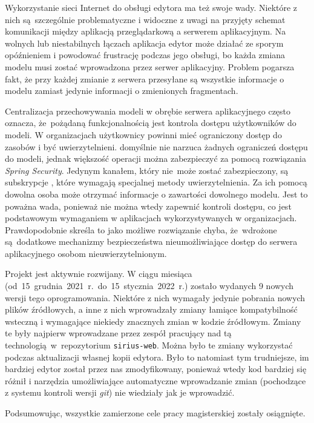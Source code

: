Wykorzystanie sieci Internet do obsługi edytora ma też swoje wady. Niektóre z
nich są~szczególnie problematyczne i widoczne z uwagi na przyjęty schemat
komunikacji między aplikacją przeglądarkową a serwerem aplikacyjnym. Na wolnych
lub niestabilnych łączach aplikacja edytor może działać ze sporym opóźnieniem i
powodować frustrację podczas jego obsługi, bo każda zmiana modelu musi zostać
wprowadzona przez serwer aplikacyjny. Problem pogarsza fakt, że przy każdej
zmianie z serwera przesyłane są wszystkie informacje o modelu zamiast jedynie
informacji o zmienionych fragmentach.

Centralizacja przechowywania modeli w obrębie serwera aplikacyjnego często
oznacza, że~pożądaną funkcjonalnością jest kontrola dostępu użytkowników do
modeli. W organizacjach użytkownicy powinni mieć ograniczony dostęp do zasobów
i być uwierzytelnieni. \SiriusWeb{} domyślnie nie narzuca żadnych
ograniczeń dostępu do modeli, jednak większość operacji można zabezpieczyć za
pomocą rozwiązania \emph{Spring Security}. Jedynym kanałem, który nie~może
zostać
zabezpieczony, są subskrypcje \GraphQL{}, które wymagają specjalnej metody
uwierzytelnienia. Za ich pomocą dowolna osoba może otrzymać informacje o
zawartości dowolnego modelu. Jest to poważna wada, ponieważ nie można wtedy
zapewnić kontroli dostępu, co jest podstawowym wymaganiem w aplikacjach
wykorzystywanych w organizacjach. Prawdopodobnie skreśla to \SiriusWeb{}
jako możliwe rozwiązanie chyba, że~wdrożone są~dodatkowe mechanizmy
bezpieczeństwa nieumożliwiające dostęp do serwera aplikacyjnego osobom
nieuwierzytelnionym.

Projekt \SiriusWeb{} jest aktywnie rozwijany. W ciągu miesiąca
(od~15~grudnia~2021~r.~do~15~stycznia~2022~r.) zostało wydanych 9 nowych
wersji tego
oprogramowania. Niektóre z nich wymagały jedynie pobrania nowych plików
źródłowych, a inne z nich wprowadzały zmiany łamiące kompatybilność wsteczną i
wymagające niekiedy znacznych zmian w kodzie źródłowym. Zmiany te były najpierw
wprowadzane przez zespół pracujący nad tą technologią w~repozytorium
\texttt{sirius-web}. Można było te zmiany wykorzystać podczas aktualizacji
własnej kopii edytora. Było to natomiast tym trudniejsze, im bardziej edytor
został przez nas zmodyfikowany, ponieważ wtedy kod bardziej się różnił i
narzędzia umożliwiające automatyczne wprowadzanie zmian (pochodzące z systemu
kontroli wersji \emph{git}) nie wiedziały jak je wprowadzić.

Podsumowując, wszystkie zamierzone cele pracy magisterskiej zostały osiągnięte.

